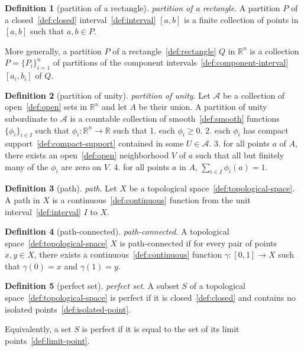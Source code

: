 \documentclass[12pt,a4paper]{article}
\theoremstyle{definition}
\newtheorem{definition}{Definition}
\begin{document}
\begin{definition}[partition of a rectangle]\label{def:partition-of-a-rectangle}
\emph{partition of a rectangle}. A partition $P$ of a closed~\ref{def:closed} interval~\ref{def:interval} $[a,b]$ is a finite collection of points in $[a,b]$ such that $a,b \in P$.

More generally, a partition $P$ of a rectangle~\ref{def:rectangle} $Q$ in $\mathbb R^n$ is a collection $P = \{P_i\}_{i=1}^n$ of partitions of the component intervals~\ref{def:component-interval} $[a_i,b_i]$ of $Q$.
\end{definition}

\begin{definition}[partition of unity]\label{def:partition-of-unity}
\emph{partition of unity}. Let $\mathcal A$ be a collection of open~\ref{def:open} sets in $\mathbb R^n$ and let $A$ be their union. A partition of unity subordinate to $\mathcal A$ is a countable collection of smooth~\ref{def:smooth} functions $\{\phi_i\}_{i\in I}$ such that $\phi_i:\mathbb R^n \to \mathbb R$ such that 
1. each $\phi_i \geq 0$.
2. each $\phi_i$ has compact support~\ref{def:compact-support} contained in some $U \in \mathcal A$.
3. for all points $a$ of $A$, there exists an open~\ref{def:open} neighborhood $V$ of $a$ such that all but finitely many of the $\phi_i$ are zero on $V$.
4. for all points $a$ in $A$, $\sum\limits_{i\in I} \phi_i(a) = 1$.
\end{definition}

\begin{definition}[path]\label{def:path}
\emph{path}. Let $X$ be a topological space~\ref{def:topological-space}. A path in $X$ is a continuous~\ref{def:continuous} function from the unit interval~\ref{def:interval} $I$ to $X$.
\end{definition}

\begin{definition}[path-connected]\label{def:path-connected}
\emph{path-connected}. A topological space~\ref{def:topological-space} $X$ is path-connected if for every pair of points $x,y \in X$, there exists a continuous~\ref{def:continuous} function $\gamma:[0,1]\to X$ such that $\gamma(0)=x$ and $\gamma(1)=y$.
\end{definition}

\begin{definition}[perfect set]\label{def:perfect-set}
\emph{perfect set}. A subset $S$ of a topological space~\ref{def:topological-space} is perfect if it is closed~\ref{def:closed} and contains no isolated points~\ref{def:isolated-point}. 

Equivalently, a set $S$ is perfect if it is equal to the set of its limit points~\ref{def:limit-point}.
\end{definition}
\end{document}

